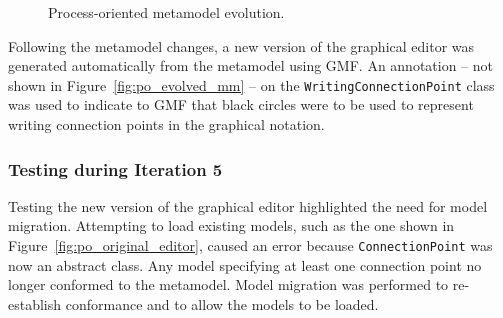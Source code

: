 \begin{figure}[htbp]
	\centering
	\caption{Process-oriented metamodel evolution.}
\label{fig:po_mms}
\end{figure}

Following the metamodel changes, a new version of the graphical editor was generated automatically from the metamodel using GMF. An annotation -- not shown in Figure~\ref{fig:po_evolved_mm} -- on the \texttt{Wr\-i\-ti\-ngCo\-nn\-ec\-ti\-o\-nPo\-i\-nt} class was used to indicate to GMF that black circles were to be used to represent writing connection points in the graphical notation.

\subsubsection{Testing during Iteration 5}
Testing the new version of the graphical editor highlighted the need for model migration. Attempting to load existing models, such as the one shown in Figure~\ref{fig:po_original_editor}, caused an error because \texttt{Co\-nn\-ec\-ti\-onP\-oi\-nt} was now an abstract class. Any model specifying at least one connection point no longer conformed to the metamodel. Model migration was performed to re-establish conformance and to allow the models to be loaded. 


